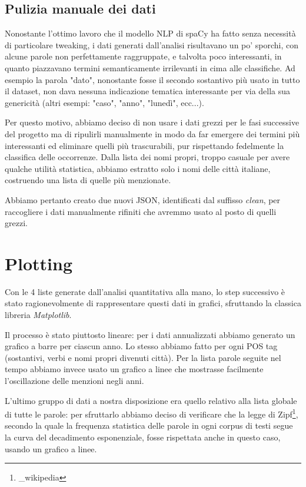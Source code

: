 \documentclass[11pt]{article}
\begin{document}
\subsection{Pulizia manuale dei dati}
\label{sect:pdf}
Nonostante l'ottimo lavoro che il modello NLP di spaCy ha fatto senza necessità di
particolare tweaking, i dati generati dall'analisi risultavano un po' sporchi, con alcune
parole non perfettamente raggruppate, e talvolta poco interessanti, in quanto piazzavano
termini semanticamente irrilevanti in cima alle classifiche. Ad esempio la parola "dato",
nonostante fosse il secondo sostantivo più usato in tutto il dataset, non dava nessuna
indicazione tematica interessante per via della sua genericità (altri esempi: "caso",
"anno", "lunedì", ecc...).

Per questo motivo, abbiamo deciso di non usare i dati grezzi per le fasi successive del
progetto ma di ripulirli manualmente in modo da far emergere dei termini più interessanti
ed eliminare quelli più trascurabili, pur rispettando fedelmente la classifica delle 
occorrenze. Dalla lista dei nomi propri, troppo casuale per avere qualche utilità
statistica, abbiamo estratto solo i nomi delle città italiane, costruendo una lista di
quelle più menzionate.

Abbiamo pertanto creato due nuovi JSON, identificati dal suffisso \textit{clean}, per
raccogliere i dati manualmente rifiniti che avremmo usato al posto di quelli grezzi.


\section{Plotting}
Con le 4 liste generate dall'analisi quantitativa alla mano, lo step successivo è stato
ragionevolmente di rappresentare questi dati in grafici, sfruttando la classica libreria
\textit{Matplotlib}.

Il processo è stato piuttosto lineare: per i dati annualizzati abbiamo generato un grafico
a barre per ciascun anno. Lo stesso abbiamo fatto per ogni POS tag (sostantivi, verbi e
nomi propri divenuti città). Per la lista parole seguite nel tempo abbiamo invece usato un 
grafico a linee che mostrasse facilmente l'oscillazione delle menzioni negli anni.

L'ultimo gruppo di dati a nostra disposizione era quello relativo alla lista globale di
tutte le parole: per sfruttarlo abbiamo deciso di verificare che la legge di
Zipf\footnote{\zipf_wikipedia}, secondo la quale la frequenza statistica delle parole in
ogni corpus di testi segue la curva del decadimento esponenziale, fosse rispettata anche 
in questo caso, usando un grafico a linee.
\end{document}
